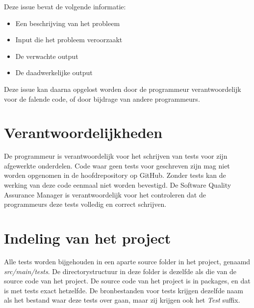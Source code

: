 \noindent
Deze issue bevat de volgende informatie:
\begin{itemize}
	\item Een beschrijving van het probleem
	\item Input die het probleem veroorzaakt
	\item De verwachte output
	\item De daadwerkelijke output
\end{itemize}

Deze issue kan daarna opgelost worden door de programmeur verantwoordelijk voor de falende code, of door bijdrage van andere programmeurs.

\section{Verantwoordelijkheden}
De programmeur is verantwoordelijk voor het schrijven van tests voor zijn afgewerkte onderdelen. Code waar geen tests voor geschreven zijn mag niet worden opgenomen in de hoofdrepository op GitHub. Zonder tests kan de werking van deze code eenmaal niet worden bevestigd. De Software Quality Assurance Manager is verantwoordelijk voor het controleren dat de programmeurs deze tests volledig en correct schrijven.

\section{Indeling van het project}
Alle tests worden bijgehouden in een aparte source folder in het project, genaamd \emph{src/main/tests}.
De directorystructuur in deze folder is dezelfde als die van de source code van het project.
De source code van het project is in packages, en dat is met tests exact hetzelfde.
De bronbestanden voor tests krijgen dezelfde naam als het bestand waar deze tests over gaan, maar zij krijgen ook het \emph{Test} suffix.

